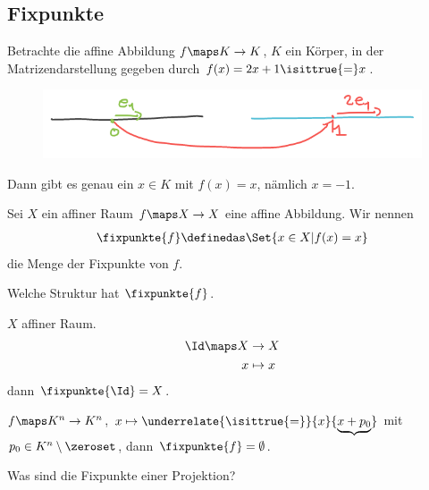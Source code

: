 \subsection*{Fixpunkte}
\begin{beispiel}
    Betrachte die affine Abbildung \( f\maps K\to K \), \( K \) ein Körper, in der Matrizendarstellung gegeben durch \( f(x)=2x+1\isittrue{=}x \).
    \begin{figure}[H]
        \centering
        \includegraphics[width=0.5\linewidth]{figures/affiner_fixpunkt_1_d}
        \label{fig:affiner_fixpunkt_1_d}
    \end{figure}
    Dann gibt es genau ein \( x\in K \) mit \( f(x)=x \), nämlich \( x=-1 \).
\end{beispiel}
\begin{definition*}
    Sei \( X \) ein affiner Raum \( f\maps X\to X \) eine affine Abbildung. Wir nennen
    \begin{align*}
        \fixpunkte{f}\definedas \Set{x\in X|f(x)=x}
    \end{align*}
    die Menge der Fixpunkte von \( f \).
\end{definition*}
\begin{frage*}
    Welche Struktur hat \( \fixpunkte{f} \).
\end{frage*}
\begin{beispiel}
    \( X \) affiner Raum.
    \begin{align*}
        \Id\maps \begin{aligned}[t]
            X&\to X\\
            x&\mapsto x
        \end{aligned}
    \end{align*}
    dann \( \fixpunkte{\Id}=X \).
\end{beispiel}
\begin{beispiel}
    \( f\maps K^n\to K^n \), \( x\mapsto \underrelate{\isittrue{=}}{x}{\underbrace{x+p_0}} \) mit \( p_0\in K^n\setminus \zeroset \), dann \( \fixpunkte{f}=\emptyset \).
\end{beispiel}
\begin{beispiel}
    \begin{frage*}
        Was sind die Fixpunkte einer Projektion?
    \end{frage*}
    
\end{beispiel}
